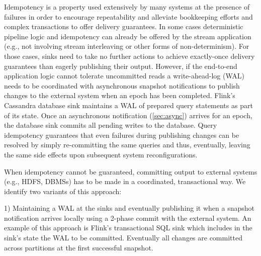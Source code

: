  Idempotency is a property used extensively by many systems at the presence of failures in order to encourage repeatability and alleviate bookkeeping efforts and complex transactions to offer delivery guarantees\cite{CUSTOM:web/SparkStructuredStreaming,millwheel}. In some cases deterministic pipeline logic and idempotency can already be offered by the stream application (e.g., not involving stream interleaving or other forms of non-determinism). For those cases, sinks need to take no further actions to achieve exactly-once delivery guarantees than eagerly publishing their output. However, if the end-to-end application logic cannot tolerate uncommitted reads a write-ahead-log (WAL) needs to be coordinated with asynchronous snapshot notifications to publish changes to the external system when an epoch has been completed. Flink's Cassandra database sink maintains a WAL of prepared query statements as part of its state. Once an asynchronous notification (\autoref{sec:async}) arrives for an epoch, the database sink commits all pending writes to the database. Query idempotency guarantees that even failures during publishing changes can be resolved by simply re-committing the same queries and thus, eventually, leaving the same side effects upon subsequent system reconfigurations. 


 When idempotency cannot be guaranteed, committing output to external systems (e.g., HDFS, DBMSs) has to be made in a coordinated, transactional way. We identify two variants of this approach:

1) Maintaining a WAL at the sinks and eventually publishing it when a snapshot notification arrives locally using a 2-phase commit with the external system. An example of this approach is Flink's transactional SQL sink which includes in the sink's state the WAL to be committed. Eventually all changes are committed across partitions at the first successful snapshot. 

